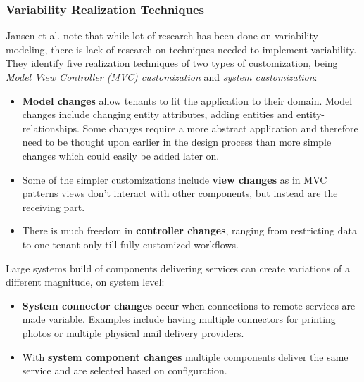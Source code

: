 

\subsubsection{Variability Realization Techniques}
Jansen et al. \cite{jansen2010customization} note that while lot of research has been done on variability modeling, there is lack of research on techniques needed to implement variability. They identify five realization techniques of two types of customization, being \textit{Model View Controller (MVC) customization} and \textit{system customization}:
\begin{itemize}
\item \textbf{Model changes} allow tenants to fit the application to their domain. Model changes include changing entity attributes, adding entities and entity-relationships. Some changes require a more abstract application and therefore need to be thought upon earlier in the design process than more simple changes which could easily be added later on.
\item Some of the simpler customizations include \textbf{view changes} as in MVC patterns views don't interact with other components, but instead are the receiving part.
\item There is much freedom in \textbf{controller changes}, ranging from restricting data to one tenant only till fully customized workflows.
\end{itemize}
Large systems build of components delivering services can create variations of a different magnitude, on system level:
\begin{itemize}
\item \textbf{System connector changes} occur when connections to remote services are made variable. Examples include having multiple connectors for printing photos or multiple physical mail delivery providers.
\item With \textbf{system component changes} multiple components deliver the same service and are selected based on configuration.
\end{itemize}

